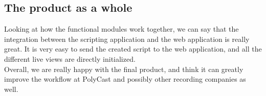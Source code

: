 \subsection*{The product as a whole}
Looking at how the functional modules work together, we can say that the integration between the scripting application and the web application is really great. It is very easy to send the created script to the web application, and all the different live views are directly initialized.\\
Overall, we are really happy with the final product, and think it can greatly improve the workflow at PolyCast and possibly other recording companies as well.